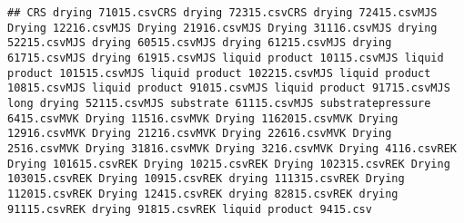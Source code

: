 \documentclass[12pt,]{article}
\newenvironment{Shaded}{\begin{snugshade}}{\end{snugshade}}
\newcommand{\KeywordTok}[1]{\textcolor[rgb]{0.13,0.29,0.53}{\textbf{#1}}}
\newcommand{\StringTok}[1]{\textcolor[rgb]{0.31,0.60,0.02}{#1}}
\newcommand{\CommentTok}[1]{\textcolor[rgb]{0.56,0.35,0.01}{\textit{#1}}}
\newcommand{\OtherTok}[1]{\textcolor[rgb]{0.56,0.35,0.01}{#1}}
\newcommand{\ControlFlowTok}[1]{\textcolor[rgb]{0.13,0.29,0.53}{\textbf{#1}}}
\newcommand{\OperatorTok}[1]{\textcolor[rgb]{0.81,0.36,0.00}{\textbf{#1}}}
\newcommand{\NormalTok}[1]{#1}
\begin{document}
\begin{Shaded}
\end{Shaded}

\begin{verbatim}
## CRS drying 71015.csvCRS drying 72315.csvCRS drying 72415.csvMJS Drying 12216.csvMJS Drying 21916.csvMJS Drying 31116.csvMJS drying 52215.csvMJS drying 60515.csvMJS drying 61215.csvMJS drying 61715.csvMJS drying 61915.csvMJS liquid product 10115.csvMJS liquid product 101515.csvMJS liquid product 102215.csvMJS liquid product 10815.csvMJS liquid product 91015.csvMJS liquid product 91715.csvMJS long drying 52115.csvMJS substrate 61115.csvMJS substratepressure 6415.csvMVK Drying 11516.csvMVK Drying 1162015.csvMVK Drying 12916.csvMVK Drying 21216.csvMVK Drying 22616.csvMVK Drying 2516.csvMVK Drying 31816.csvMVK Drying 3216.csvMVK Drying 4116.csvREK Drying 101615.csvREK Drying 10215.csvREK Drying 102315.csvREK Drying 103015.csvREK Drying 10915.csvREK drying 111315.csvREK Drying 112015.csvREK Drying 12415.csvREK drying 82815.csvREK drying 91115.csvREK drying 91815.csvREK liquid product 9415.csv
\end{verbatim}
\end{document}
